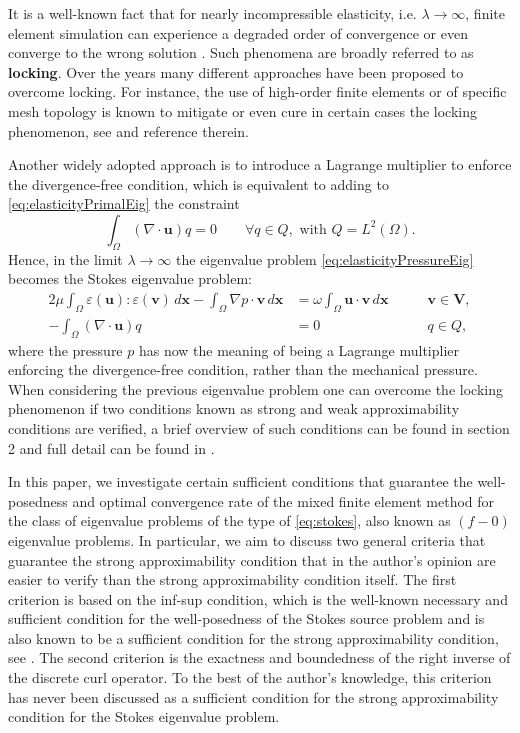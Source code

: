 \documentclass[USenglish]{article}
\theoremstyle{dgthm}
\theoremstyle{dgdef}
\let\vec\bm
\begin{document}
It is a well-known fact that for nearly incompressible elasticity, i.e. $\lambda\to \infty$, finite element simulation can experience a degraded order of convergence or even converge to the wrong solution \cite{AinsworthParker}. Such phenomena are broadly referred to as \textbf{locking}. Over the years many different approaches have been proposed to overcome locking.
For instance, the use of high-order finite elements or of specific mesh topology is known to mitigate or even cure in certain cases the locking phenomenon, see \cite{AinsworthParker, BabuskaSuri, BBF} and reference therein.

Another widely adopted approach is to introduce a Lagrange multiplier to enforce the divergence-free condition, which is equivalent to adding to \eqref{eq:elasticityPrimalEig} the constraint
\begin{equation}
  \label{eq:lagrangeMultiplier}
  \int_\Omega (\nabla\cdot \vec{u})q = 0 \qquad \forall  q\in Q, \text{ with } Q=L^2(\Omega).
\end{equation}
Hence, in the limit $\lambda\to \infty $ the eigenvalue problem \eqref{eq:elasticityPressureEig} becomes the Stokes eigenvalue problem:
\begin{equation}
  \label{eq:stokes}
  \begin{aligned}
    2\mu \int_\Omega \varepsilon(\vec{u}):\varepsilon(\vec{v})\, d\vec{x}-\int_\Omega \nabla p \cdot \vec{v}\, d\vec{x} &= \omega \int_\Omega \vec{u}\cdot \vec{v}\, d\vec{x} \qquad &\vec{v}\in \vec{V},\\
    -\int_\Omega (\nabla\cdot \vec{u})q &= 0 \qquad&q \in Q,
  \end{aligned}
\end{equation}
where the pressure $p$ has now the meaning of being a Lagrange multiplier enforcing the divergence-free condition, rather than the mechanical pressure.
When considering the previous eigenvalue problem one can overcome the locking phenomenon if two conditions known as strong and weak approximability conditions are verified, a brief overview of such conditions can be found in section 2 and full detail can be found in \cite{BBG, BBF}.

In this paper, we investigate certain sufficient conditions that guarantee the well-posedness and optimal convergence rate of the mixed finite element method for the class of eigenvalue problems of the type of \eqref{eq:stokes}, also known as $(f\!-\!0)$ eigenvalue problems.
In particular, we aim to discuss two general criteria that guarantee the strong approximability condition that in the author's opinion are easier to verify than the strong approximability condition itself.
The first criterion is based on the inf-sup condition, which is the well-known necessary and sufficient condition for the well-posedness of the Stokes source problem and is also known to be a sufficient condition for the strong approximability condition, see \cite{BBF,BBG}.
The second criterion is the exactness and boundedness of the right inverse of the discrete curl operator. To the best of the author's knowledge, this criterion has never been discussed as a sufficient condition for the strong approximability condition for the Stokes eigenvalue problem.
\end{document}
